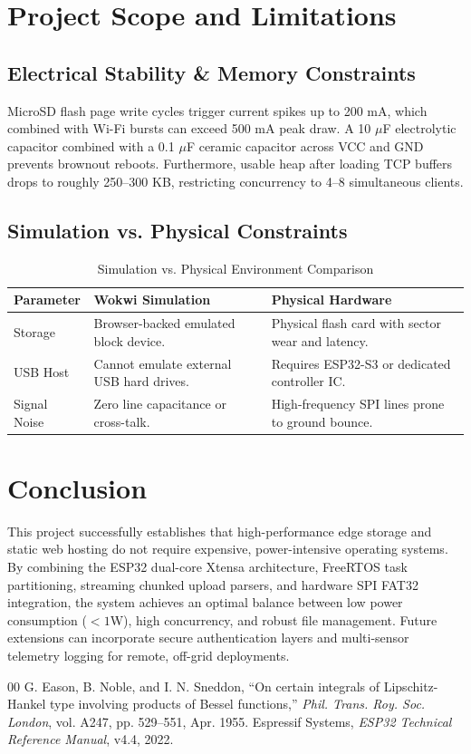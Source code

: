 \documentclass[conference]{IEEEtran}
\begin{document}
\section{Project Scope and Limitations}

\subsection{Electrical Stability \& Memory Constraints}
MicroSD flash page write cycles trigger current spikes up to 200 mA, which combined with Wi-Fi bursts can exceed 500 mA peak draw. A 10 $\mu$F electrolytic capacitor combined with a 0.1 $\mu$F ceramic capacitor across VCC and GND prevents brownout reboots. Furthermore, usable heap after loading TCP buffers drops to roughly 250--300 KB, restricting concurrency to 4--8 simultaneous clients.

\subsection{Simulation vs. Physical Constraints}
\begin{table}[htbp]
\caption{Simulation vs. Physical Environment Comparison}
\begin{center}
\begin{tabular}{p{2.2cm} p{2.7cm} p{2.7cm}}
\toprule
\textbf{Parameter} & \textbf{Wokwi Simulation} & \textbf{Physical Hardware} \\
\midrule
Storage & Browser-backed emulated block device. & Physical flash card with sector wear and latency. \\
USB Host & Cannot emulate external USB hard drives. & Requires ESP32-S3 or dedicated controller IC. \\
Signal Noise & Zero line capacitance or cross-talk. & High-frequency SPI lines prone to ground bounce. \\
\bottomrule
\end{tabular}
\label{tab:comparison}
\end{center}
\end{table}

\section{Conclusion}
This project successfully establishes that high-performance edge storage and static web hosting do not require expensive, power-intensive operating systems. By combining the ESP32 dual-core Xtensa architecture, FreeRTOS task partitioning, streaming chunked upload parsers, and hardware SPI FAT32 integration, the system achieves an optimal balance between low power consumption ($<1$W), high concurrency, and robust file management. Future extensions can incorporate secure authentication layers and multi-sensor telemetry logging for remote, off-grid deployments.

\begin{thebibliography}{00}
 G. Eason, B. Noble, and I. N. Sneddon, ``On certain integrals of Lipschitz-Hankel type involving products of Bessel functions,'' \textit{Phil. Trans. Roy. Soc. London}, vol. A247, pp. 529--551, Apr. 1955.
 Espressif Systems, \textit{ESP32 Technical Reference Manual}, v4.4, 2022.
\end{thebibliography}
\end{document}
